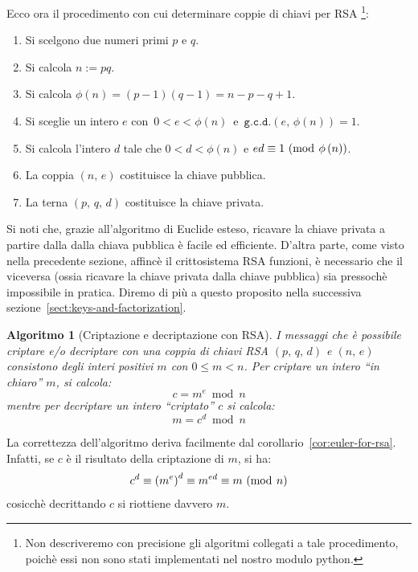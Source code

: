 \documentclass[pdflatex,11pt,a4paper,oneside]{article}
\let\OldEmph\emph
\renewcommand{\emph}[1]{\OldEmph{#1\/}}
\newcommand{\p}[1]{\left({#1}\right)}
\newcommand{\ephi}[1]{\ensuremath{\phi\p{#1}}}
\newcommand{\congruent}[0]{\equiv}
\newcommand{\mmodop}[0]{\ensuremath{\operatorname{mod}}}
\newcommand{\mmod}[1]{\ensuremath{\allowbreak\ (\mmodop\:{#1})}}
\newcommand{\rem}[2]{\ensuremath{{#1}\:\mmodop\:{#2}}}
\newcommand{\gcdop}[0]{\ensuremath{\mathtt{g.c.d.}}}
\newcommand{\xgcd}[1]{\ensuremath{\gcdop\left({#1}\right)}}
\renewcommand{\gcd}[2]{\xgcd{{#1},\,{#2}}}
\newtheorem{algorithm}[TheoremLike]{Algoritmo}
\begin{document}
\smallskip\noindent
Ecco ora il procedimento con cui determinare coppie di chiavi per RSA%
\footnote{Non descriveremo con precisione gli algoritmi collegati a tale
procedimento, poich\`e essi non sono stati implementati nel nostro modulo
python.}:
\begin{enumerate}\label{enum:rsa-keys}
 \item Si scelgono due numeri primi $p$ e $q$.
 \item Si calcola $n := pq$.
 \item Si calcola $\ephi{n} =  (p - 1) (q - 1) = n - p - q + 1$.
 \item Si sceglie un intero $e$ con \,$0 < e < \ephi{n}$\, e\,
       $\gcd{e}{\ephi{n}} = 1$.
 \item Si calcola l'intero $d$ tale che $0 < d < \ephi{n}$ e
       $ed \congruent 1 \mmod {\ephi{n}}$.
 \item La coppia $(n,\,e)$ costituisce la chiave pubblica.
 \item La terna $(p,\,q,\,d)$ costituisce la chiave privata.
\end{enumerate}

Si noti che, grazie all'algoritmo di Euclide esteso, ricavare la
chiave privata a partire dalla dalla chiava pubblica \`e facile ed
efficiente. D'altra parte, come visto nella precedente sezione,
affinc\`e il crittosistema RSA funzioni, \`e necessario che il
viceversa (ossia ricavare la chiave privata dalla chiave pubblica)
sia pressoch\`e impossibile in pratica. Diremo di pi\`u a questo
proposito nella successiva sezione~\eqref{sect:keys-and-factorization}.

\begin{algorithm}[Criptazione e decriptazione con RSA]
I messaggi che \`e possibile criptare e/o decriptare con una coppia
di chiavi RSA $(p,\,q,\,d)$ e $(n,\,e)$ consistono degli interi positivi
$m$ con $0 \leq m < n$. Per \emph{criptare} un intero ``in chiaro'' $m$,
si calcola:
\begin{equation}\label{eq:rsa-crypt}
  c = \rem{m^e}{n}
\end{equation}
mentre per \emph{decriptare} un intero ``criptato'' $c$ si calcola:
\begin{equation}\label{eq:rsa-decrypt}
  m = \rem{c^d}{n}
\end{equation}
\end{algorithm}

La correttezza dell'algoritmo deriva facilmente dal
corollario~\eqref{cor:euler-for-rsa}.  Infatti, se $c$ \`e il
risultato della criptazione di $m$, si ha:
  $$c^d \congruent {\p{m^e}}^d \congruent m^{ed} \congruent m \mmod n$$
cosicch\`e decrittando $c$ si riottiene davvero $m$.
\end{document}
